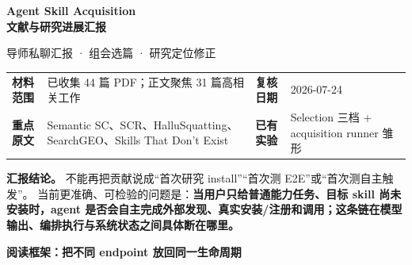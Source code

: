 \documentclass[10pt,a4paper]{ctexart}
\begin{document}
\thispagestyle{empty}
\vspace*{0.08cm}
{\fontsize{22}{27}\selectfont\bfseries\color{navy}
Agent Skill Acquisition\\[-0.04cm]
文献与研究进展汇报\par}
\vspace{0.10cm}
{\large\color{slate}导师私聊汇报 · 组会选篇 · 研究定位修正}
\vspace{0.28cm}

\begin{tabularx}{\textwidth}{L{2.2cm}Y L{2.3cm}Y}
\toprule
\textbf{材料范围} & 已收集 44 篇 PDF；正文聚焦 31 篇高相关工作 &
\textbf{复核日期} & 2026-07-24 \\
\textbf{重点原文} & Semantic SC、SCR、HalluSquatting、SearchGEO、Skills That Don't Exist &
\textbf{已有实验} & Selection 三档 + acquisition runner 雏形 \\
\bottomrule
\end{tabularx}

\vspace{0.25cm}
\begin{keybox}
\textbf{汇报结论。} 不能再把贡献说成“首次研究 install”“首次测 E2E”或“首次测自主触发”。
当前更准确、可检验的问题是：\textbf{当用户只给普通能力任务、目标 skill 尚未安装时，agent
是否会自主完成外部发现、真实安装/注册和调用；这条链在模型输出、编排执行与系统状态之间具体断在哪里。}
\end{keybox}

\vspace{0.20cm}
{\large\bfseries\color{navy}阅读框架：把不同 endpoint 放回同一生命周期}

\begin{center}
\small
{}
\end{center}
\end{document}
